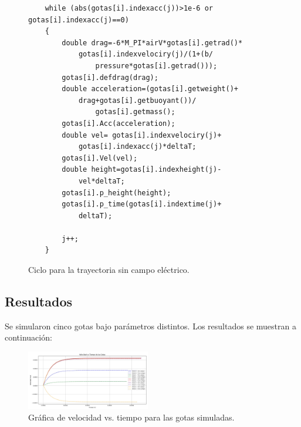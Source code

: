 \documentclass[
 reprint,
 amsmath,amssymb,
 aps,
]{revtex4-2}
\begin{document}
\begin{figure}[H]
\begin{lstlisting}
    while (abs(gotas[i].indexacc(j))>1e-6 or gotas[i].indexacc(j)==0)
    {
        double drag=-6*M_PI*airV*gotas[i].getrad()*
            gotas[i].indexvelociry(j)/(1+(b/
                pressure*gotas[i].getrad()));
        gotas[i].defdrag(drag);
        double acceleration=(gotas[i].getweight()+
            drag+gotas[i].getbuoyant())/
                gotas[i].getmass();
        gotas[i].Acc(acceleration);
        double vel= gotas[i].indexvelociry(j)+
            gotas[i].indexacc(j)*deltaT;
        gotas[i].Vel(vel);
        double height=gotas[i].indexheight(j)-
            vel*deltaT;
        gotas[i].p_height(height);
        gotas[i].p_time(gotas[i].indextime(j)+
            deltaT);
        
        j++;
    }
\end{lstlisting}
\caption{Ciclo para la trayectoria sin campo el\'ectrico.}
\end{figure}

\subsection{Resultados}

Se simularon cinco gotas bajo par\'ametros distintos. Los resultados se muestran a continuación:

\begin{table}[H]
\centering
{}
\caption{Valores de velocidad y carga para cada gota simulada.}
\end{table}

\begin{figure}[H]
\centering
\includegraphics[width=0.48\textwidth]{Screenshot 2025-04-27 at 22.22.51.jpg}
\caption{Gr\'afica de velocidad vs. tiempo para las gotas simuladas.}
\end{figure}
\end{document}

